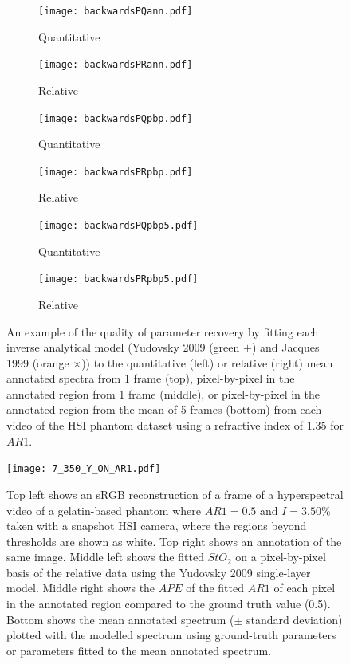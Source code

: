 \begin{figure}[h!]
    \centering
    \begin{subfigure}{0.49\textwidth}
        \texttt{[image: backwardsPQann.pdf]}
        \caption{Quantitative}
        \label{fig:backwardsPQann}
    \end{subfigure}
    \begin{subfigure}{0.49\textwidth}
        \texttt{[image: backwardsPRann.pdf]}
        \caption{Relative}
        \label{fig:backwardsPRann}
    \end{subfigure}
    \begin{subfigure}{0.49\textwidth}
        \texttt{[image: backwardsPQpbp.pdf]}
        \caption{Quantitative}
        \label{fig:backwardsPQpbp}
    \end{subfigure}
    \begin{subfigure}{0.49\textwidth}
        \texttt{[image: backwardsPRpbp.pdf]}
        \caption{Relative}
        \label{fig:backwardsPRpbp}
    \end{subfigure}
    \begin{subfigure}{0.49\textwidth}
        \texttt{[image: backwardsPQpbp5.pdf]}
        \caption{Quantitative}
        \label{fig:backwardsPQpbp5}
    \end{subfigure}
    \begin{subfigure}{0.49\textwidth}
        \texttt{[image: backwardsPRpbp5.pdf]}
        \caption{Relative}
        \label{fig:backwardsPRpbp5}
    \end{subfigure}
    \caption{An example of the quality of parameter recovery by fitting each inverse analytical model (Yudovsky 2009 (\textcolor{MyGreen}{green $+$}) and Jacques 1999 (\textcolor{MyOrange}{orange $\times$})) to the quantitative (left) or relative (right) mean annotated spectra from 1 frame (top), pixel-by-pixel in the annotated region from 1 frame (middle), or pixel-by-pixel in the annotated region from the mean of 5 frames (bottom) from each video of the HSI phantom dataset using a refractive index of 1.35 for $AR1$.}
    \label{fig:backwardsHSIphantomsann}
\end{figure}

\begin{figure}[h!]
    \centering 
    \texttt{[image: 7\_350\_Y\_ON\_AR1.pdf]}
    \caption{Top left shows an sRGB reconstruction of a frame of a hyperspectral video of a gelatin-based phantom where $AR1=0.5$ and $I=3.50\%$ taken with a snapshot HSI camera, where the regions beyond thresholds are shown as white. Top right shows an annotation of the same image. Middle left shows the fitted $StO_2$ on a pixel-by-pixel basis of the relative data using the Yudovsky 2009 single-layer model. Middle right shows the $APE$ of the fitted $AR1$ of each pixel in the annotated region compared to the ground truth value (0.5). Bottom shows the mean annotated spectrum ($\pm$ standard deviation) plotted with the modelled spectrum using ground-truth parameters or parameters fitted to the mean annotated spectrum.}
    \label{fig:gelatinpbpeg}
\end{figure}

